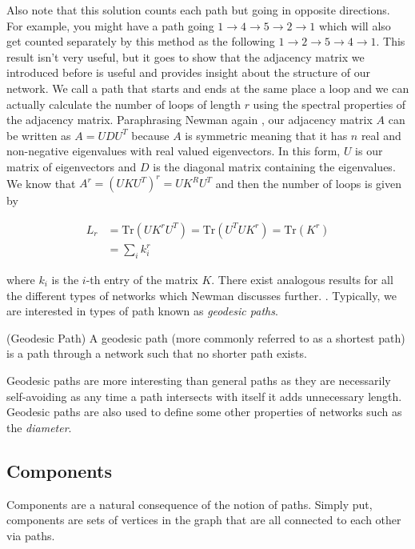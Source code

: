 Also note that this solution counts each path but going in opposite directions. For example, you might have a path going $1 \rightarrow 4 \rightarrow 5 \rightarrow 2 \rightarrow 1$ which will also get counted separately by this method as the following $1 \rightarrow 2 \rightarrow 5 \rightarrow 4 \rightarrow 1$. This result isn't very useful, but it goes to show that the adjacency matrix we introduced before is useful and provides insight about the structure of our network. We call a path that starts and ends at the same place a loop and we can actually calculate the number of loops of length $r$ using the spectral properties of the adjacency matrix. Paraphrasing Newman again \cite[137]{newman10}, our adjacency matrix $A$ can be written as $A = UDU^T$ because $A$ is symmetric meaning that it has $n$ real and non-negative eigenvalues with real valued eigenvectors. In this form, $U$ is our matrix of eigenvectors and $D$ is the diagonal matrix containing the eigenvalues. We know that $A^r = (UKU^T)^r = UK^RU^T$ and then the number of loops is given by

$$
\begin{aligned}
    L_r &= \text{Tr}(UK^rU^T) = \text{Tr}(U^TUK^r) = \text{Tr}(K^r) \\
    & = \sum_i k_i^r
\end{aligned}
$$

where $k_i$ is the $i$-th entry of the matrix $K$. There exist analogous results for all the different types of networks which Newman discusses further. \cite[138]{newman10}. Typically, we are interested in types of path known as \emph{geodesic paths}.

\begin{definition}{(Geodesic Path)}
    A geodesic path (more commonly referred to as a shortest path) is a path through a network such that no shorter path exists.
\end{definition}

Geodesic paths are more interesting than general paths as they are necessarily self-avoiding as any time a path intersects with itself it adds unnecessary length. Geodesic paths are also used to define some other properties of networks such as the \emph{diameter}.

\subsection{Components}
Components are a natural consequence of the notion of paths. Simply put, components are sets of vertices in the graph that are all connected to each other via paths.

